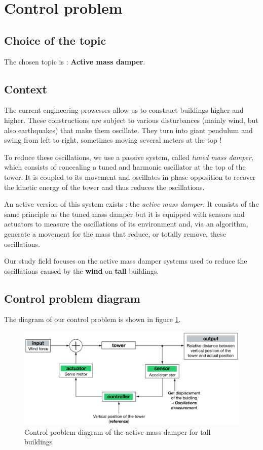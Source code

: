 \section{Control problem}

\subsection{Choice of the topic}
The chosen topic is : {\bf Active mass damper}.

\subsection{Context}
The current engineering prowesses allow us to construct buildings higher and higher. These constructions are subject to various disturbances (mainly wind, but also earthquakes) that make them oscillate. They turn into giant pendulum and swing from left to right, sometimes moving several meters at the top !\cite{YouTube_minutephysics}\par
To reduce these oscillations, we use a passive system, called {\it tuned mass damper}, which consists of concealing a tuned and harmonic oscillator at the top of the tower. It is coupled to its movement and oscillates in phase opposition to recover the kinetic energy of the tower and thus reduces the oscillations.\cite{Wikipedia_amortisseur_tmd}\par
An active version of this system exists : the {\it active mass damper}. It consists of the same principle as the tuned mass damper but it is equipped with sensors and actuators to measure the oscillations of its environment and, via an algorithm, generate a movement for the mass that reduce, or totally remove, these oscillations.\cite{sciencedirect_amd}\par
Our study field focuses on the active mass damper systems used to reduce the oscillations caused by the {\bf wind} on {\bf tall} buildings.

\subsection{Control problem diagram}
The diagram of our control problem is shown in figure \ref{fig:diagram}.
\begin{figure}[!ht]
    \centering
    \includegraphics[width=1\textwidth]{resources/pdf/control-problem-diagram.pdf}
    \caption{Control problem diagram of the active mass damper for tall buildings}
    \label{fig:diagram}
\end{figure}

